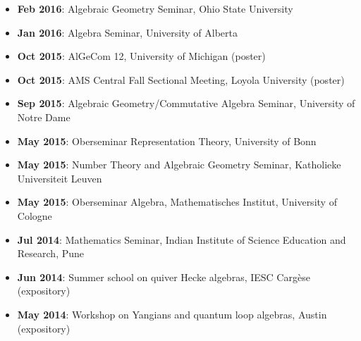 \documentclass[a4paper]{moderncv}
\begin{document}
\begin{itemize}
\item \textbf{Feb 2016}: Algebraic Geometry Seminar, Ohio State University
\item \textbf{Jan 2016}: Algebra Seminar, University of Alberta
\item \textbf{Oct 2015}: AlGeCom 12, University of Michigan (poster)
\item \textbf{Oct 2015}: AMS Central Fall Sectional Meeting, Loyola University (poster)
\item \textbf{Sep 2015}: Algebraic Geometry/Commutative Algebra Seminar, University of Notre Dame
\item \textbf{May 2015}: Oberseminar Representation Theory, University of Bonn
\item \textbf{May 2015}: Number Theory and Algebraic Geometry Seminar, Katholieke Universiteit Leuven
\item \textbf{May 2015}: Oberseminar Algebra, Mathematisches Institut, University of Cologne
\item \textbf{Jul 2014}: Mathematics Seminar, Indian Institute of Science Education and Research, Pune
\item \textbf{Jun 2014}: Summer school on quiver Hecke algebras, IESC Cargèse (expository)
\item \textbf{May 2014}: Workshop on Yangians and quantum loop algebras, Austin (expository)
\end{itemize}
\end{document}
